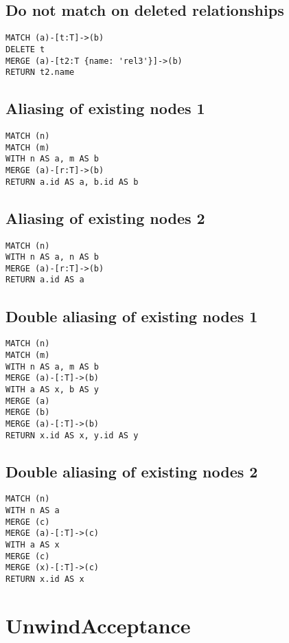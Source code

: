 \subsection{Do not match on deleted relationships}

\begin{lstlisting}
MATCH (a)-[t:T]->(b)
DELETE t
MERGE (a)-[t2:T {name: 'rel3'}]->(b)
RETURN t2.name
\end{lstlisting}

\subsection{Aliasing of existing nodes 1}

\begin{lstlisting}
MATCH (n)
MATCH (m)
WITH n AS a, m AS b
MERGE (a)-[r:T]->(b)
RETURN a.id AS a, b.id AS b
\end{lstlisting}

\subsection{Aliasing of existing nodes 2}

\begin{lstlisting}
MATCH (n)
WITH n AS a, n AS b
MERGE (a)-[r:T]->(b)
RETURN a.id AS a
\end{lstlisting}

\subsection{Double aliasing of existing nodes 1}

\begin{lstlisting}
MATCH (n)
MATCH (m)
WITH n AS a, m AS b
MERGE (a)-[:T]->(b)
WITH a AS x, b AS y
MERGE (a)
MERGE (b)
MERGE (a)-[:T]->(b)
RETURN x.id AS x, y.id AS y
\end{lstlisting}

\subsection{Double aliasing of existing nodes 2}

\begin{lstlisting}
MATCH (n)
WITH n AS a
MERGE (c)
MERGE (a)-[:T]->(c)
WITH a AS x
MERGE (c)
MERGE (x)-[:T]->(c)
RETURN x.id AS x
\end{lstlisting}
\section{UnwindAcceptance}


